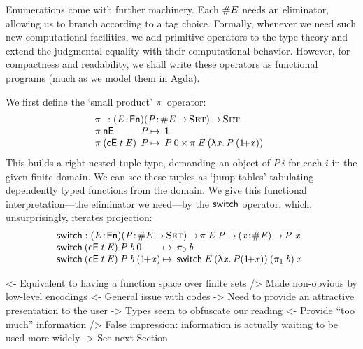 Enumerations come with further machinery. Each \(\EnumT{E}\) needs an
eliminator, allowing us to branch according to a tag choice. Formally,
whenever we need such new computational facilities, we add primitive
operators to the type theory and extend the judgmental equality with
their computational behavior. However, for compactness and readability, we
shall write these operators as functional programs (much as we
model them in Agda).

We first define the `small product' $\spi{\!}{\!}$ operator:
\[\stk{
\spi{}{}: \PITEL{\V{E}}{\EnumU}\PITEL{\V{P}}{\EnumT{\V{E}} \To \Set} \To \Set \\
\begin{array}{@{}l@{\:}l@{\:\mapsto\:\:}l}
\spi{\NilE}{& \V{P}}        & \Unit \\
\spi{(\ConsE{\V{t}}{\V{E}})}{& \V{P}} & \TIMES{\V{P}\: \Ze}{\spi{\V{E}}{(\LAM{\V{x}} \V{P}\: (\Su{\V{x}}))}}
\end{array}
}\]
This builds a right-nested
tuple type, demanding an object of $P\:i$ for each $i$ in the given finite
domain. We can see these tuples as `jump tables' tabulating dependently
typed functions from the domain. We give this functional
interpretation---the eliminator we need---by the
$\F{switch}$ operator, which, unsurprisingly, iterates projection:
\[\stk{
\begin{array}{@{}ll}
\F{switch} : \PITEL{\V{E}}{\EnumU}
               \PITEL{\V{P}}{\EnumT{\V{E}} \To \Set} \To
              \spi{\V{E}}{\V{P}} \To
               \PITEL{\V{x}}{\EnumT{\V{E}}} \To \V{P}~\x
\end{array} \\
\begin{array}{@{}l@{\:\mapsto\:\:}l}
\switch{(\ConsE{\V{t}}{\V{E}})}{\V{P}}{\V{b}}{\Ze}      & \fst{\V{b}} \\
\switch{(\ConsE{\V{t}}{\V{E}})}{\V{P}}{\V{b}}{(\Su{\V{x}})} & \switch{\V{E}}{(\LAM{\V{x}} \V{P}
  (\Su{\V{x}}))}{(\snd{\V{b}})}{\V{x}}
\end{array}
}\]


\begin{wstructure}
<- Equivalent to having a function space over finite sets
    /> Made non-obvious by low-level encodings
        <- General issue with codes
             -> Need to provide an attractive presentation to the user
    -> Types seem to obfuscate our reading
        <- Provide ``too much'' information
        /> False impression: information is actually waiting to be used more widely
        -> See next Section
\end{wstructure}

